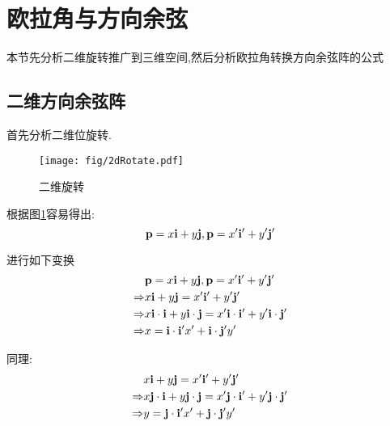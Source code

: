 
\section{欧拉角与方向余弦}
本节先分析二维旋转推广到三维空间,然后分析欧拉角转换方向余弦阵的公式
\subsection{二维方向余弦阵}
首先分析二维位旋转.
\begin{figure}[!hbp]
    \begin{center}
        \texttt{[image: fig/2dRotate.pdf]}
        \caption{二维旋转}\label{二维旋转}
    \end{center}
\end{figure}

根据图\ref{二维旋转}容易得出:
\begin{equation*}
    \mathbf{p}=x\mathbf{i}+y\mathbf{j},
    \mathbf{p}=x'\mathbf{i}'+y'\mathbf{j}'
\end{equation*} 

进行如下变换
\begin{equation*}
    \begin{split}
                    & \mathbf{p}=x\mathbf{i}+y\mathbf{j}, \mathbf{p}=x'\mathbf{i}'+y'\mathbf{j}' \\
        \Rightarrow & x\mathbf{i}+y\mathbf{j}=x'\mathbf{i}'+y'\mathbf{j}' \\
        \Rightarrow & x\mathbf{i}\cdot\mathbf{i}+y\mathbf{i}\cdot\mathbf{j}=x'\mathbf{i}\cdot\mathbf{i}'+y'\mathbf{i}\cdot\mathbf{j}' \\
        \Rightarrow & x=\mathbf{i}\cdot\mathbf{i}'x'+\mathbf{i}\cdot\mathbf{j}'y'
    \end{split}
\end{equation*} 

同理:
\begin{equation*}
    \begin{split}
                    & x\mathbf{i}+y\mathbf{j}=x'\mathbf{i}'+y'\mathbf{j}' \\
        \Rightarrow & x\mathbf{j}\cdot\mathbf{i}+y\mathbf{j}\cdot\mathbf{j}=x'\mathbf{j}\cdot\mathbf{i}'+y'\mathbf{j}\cdot\mathbf{j}' \\
        \Rightarrow & y=\mathbf{j}\cdot\mathbf{i}'x'+\mathbf{j}\cdot\mathbf{j}'y'
    \end{split}
\end{equation*} 

